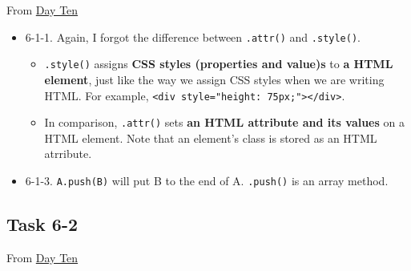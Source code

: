 \documentclass[
]{book}
\begin{document}
From \href{https://observablehq.com/@hongtaoh/day-ten-sept-3rd-2020}{Day Ten}

\begin{itemize}
\item
  6-1-1. Again, I forgot the difference between \texttt{.attr()} and \texttt{.style()}.

  \begin{itemize}
  \item
    \texttt{.style()} assigns \textbf{CSS styles (properties and value)s} to \textbf{a HTML element}, just like the way we assign CSS styles when we are writing HTML. For example, \texttt{\textless{}div\ style="height:\ 75px;"\textgreater{}\textless{}/div\textgreater{}}.
  \item
    In comparison, \texttt{.attr()} sets \textbf{an HTML attribute and its values} on a HTML element. Note that an element's class is stored as an HTML atrribute.
  \end{itemize}
\item
  6-1-3. \texttt{A.push(B)} will put B to the end of A. \texttt{.push()} is an array method.
\end{itemize}

\hypertarget{task-6-2-1}{%
\subsection{Task 6-2}\label{task-6-2-1}}

From \href{https://observablehq.com/@hongtaoh/day-ten-sept-3rd-2020}{Day Ten}
\end{document}
